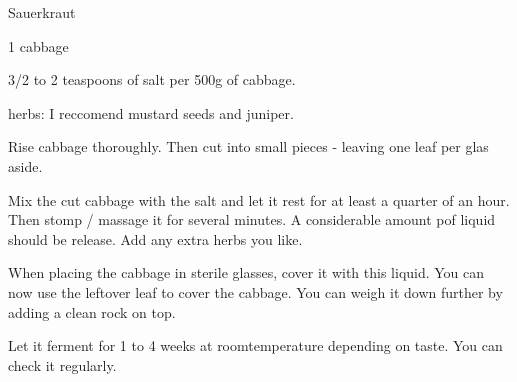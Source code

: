 \begin{recipe}{Sauerkraut}
    \begin{ingr}
    \item 1 cabbage
    \item 3/2 to 2 teaspoons of salt per 500g of cabbage.
    \item herbs: I reccomend mustard seeds and juniper.
    \end{ingr}

    Rise cabbage thoroughly. Then cut into small pieces -
    leaving one leaf per glas aside.

    Mix the cut cabbage with the salt and let it rest for
    at least a quarter of an hour. Then stomp / massage it
    for several minutes. A considerable amount pof liquid
    should be release. Add any extra herbs you like.

    When placing the cabbage in sterile glasses, cover it with
    this liquid. You can now use the leftover leaf to cover
    the cabbage. You can weigh it down further by adding a
    clean rock on top.

    Let it ferment for 1 to 4 weeks at roomtemperature
    depending on taste. You can check it regularly.
\end{recipe}
